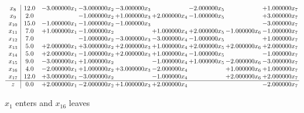 \documentclass[10pt]{article}
\begin{document}
\[\begin{array}{c| c c@{\hskip 2pt} c@{\hskip 2pt} c@{\hskip 2pt} c@{\hskip 2pt} c@{\hskip 2pt} c@{\hskip 2pt} c@{\hskip 2pt} }
 x_{8}   &  12.0 & -3.000000 x_{1} & -3.000000 x_{2} & -3.000000 x_{3} &   & -2.000000 x_{5} &   & + 1.000000 x_{7}\\
 x_{9}   &  2.0  &   & -1.000000 x_{2} & + 1.000000 x_{3} & + 2.000000 x_{4} & -1.000000 x_{5} &   & + 3.000000 x_{7}\\
 x_{10}   &  15.0 & -1.000000 x_{1} & -1.000000 x_{2} & -1.000000 x_{3} &    &    &   & -3.000000 x_{7}\\
 x_{11}   &  7.0 & + 1.000000 x_{1} & -1.000000 x_{2} &   & + 1.000000 x_{4} & + 2.000000 x_{5} & -1.000000 x_{6} & -1.000000 x_{7}\\
 x_{12}   &  7.0  &   & -1.000000 x_{2} & -3.000000 x_{3} & -3.000000 x_{4} & -1.000000 x_{5} &   & + 1.000000 x_{7}\\
 x_{13}   &  5.0 & + 2.000000 x_{1} & + 3.000000 x_{2} & + 2.000000 x_{3} & + 1.000000 x_{4} & + 2.000000 x_{5} & + 2.000000 x_{6} & + 2.000000 x_{7}\\
 x_{14}   &  5.0 & + 2.000000 x_{1} & -1.000000 x_{2} & + 2.000000 x_{3} & + 1.000000 x_{4} & -1.000000 x_{5} &   & -1.000000 x_{7}\\
 x_{15}   &  9.0 & -3.000000 x_{1} & + 1.000000 x_{2} &   & -1.000000 x_{4} & + 1.000000 x_{5} & -2.000000 x_{6} & -3.000000 x_{7}\\
 x_{16}   &  4.0 & -2.000000 x_{1} & + 1.000000 x_{2} & + 3.000000 x_{3} & -2.000000 x_{4} &   & + 1.000000 x_{6} & + 1.000000 x_{7}\\
 x_{17}   &  12.0 & + 3.000000 x_{1} & -3.000000 x_{2} &   & -1.000000 x_{4} &   & + 2.000000 x_{6} & + 2.000000 x_{7}\\
\hline
z    &  0.0 & + 2.000000 x_{1} & -2.000000 x_{2} & + 1.000000 x_{3} & + 2.000000 x_{4} &    &   & -2.000000 x_{7}\\
\end{array}\]


 $ x_{1} $ enters and $ x_{16} $ leaves 
\end{document}
